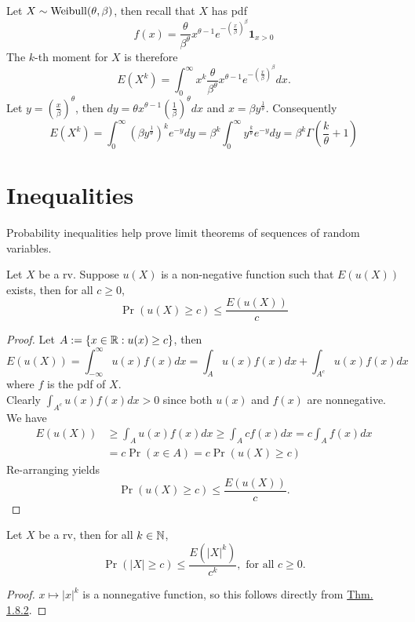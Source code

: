 \documentclass[11pt,fleqn]{book} %
\begin{document}
\begin{example}
Let \(X \sim \operatorname{Weibull}(\theta, \beta)\), then recall that \(X\) has pdf
\[
f(x) = \frac{\theta}{\beta^\theta} x^{\theta - 1}e^{-\left(\frac{x}{\beta}\right)^\beta}\mathbf{1}_{x > 0}
\]
\indent The \(k\)-th moment for \(X\) is therefore
\[
E(X^k) = \int_0^\infty x^k \frac{\theta}{\beta^\theta} x^{\theta - 1} e^{-\left(\frac{x}{\beta}\right)^\beta} dx.
\]
\indent Let \(y = \left(\frac{x}{\beta}\right)^\theta\), then \(dy = \theta x^{\theta - 1}\left(\frac1\beta\right)^\theta dx\) and \(x = \beta y^{\frac1\theta}\). Consequently
\[
E(X^k) = \int_0^\infty \left(\beta y^{\frac1\theta}\right)^k e^{-y}dy = \beta^k\int_0^\infty y^{\frac{k}{\theta}}e^{-y}dy = \beta^k\Gamma\left(\frac{k}{\theta} + 1\right)
\]
\end{example}


\section{Inequalities}

\begin{remark} Probability inequalities help prove limit theorems of sequences of random variables.
\end{remark}

\begin{theorem}
\label{thm:182}
Let \(X\) be a rv. Suppose \(u(X)\) is a non-negative function such that \(E(u(X))\) exists, then for all \(c \geq 0\), 
\[
\Pr(u(X) \geq c) \leq \frac{E(u(X))}{c}
\]
\end{theorem}
\begin{proof} Let \(A := \{x \in \mathbb{R}: u(x) \geq c\}\), then
\[
E(u(X)) = \int_{-\infty}^\infty u(x)f(x)dx = \int_A u(x)f(x)dx + \int_{A^c}u(x)f(x)dx
\]
where \(f\) is the pdf of \(X\).\\
\indent Clearly \(\int_{A^c} u(x)f(x)dx > 0\) since both \(u(x)\) and \(f(x)\) are nonnegative. We have
\[
\begin{aligned}
E(u(X)) &\geq \int_A u(x)f(x)dx \geq \int_A cf(x)dx = c\int_A f(x)dx \\
&= c\Pr(x \in A) = c\Pr(u(X) \geq c)
\end{aligned}
\]
\indent Re-arranging yields
\[
\Pr(u(X) \geq c) \leq \frac{E(u(X))}{c}.
\]
\end{proof}

\begin{corollary} Let \(X\) be a rv, then for all \(k \in \mathbb{N}\), 
\[
\Pr(|X| \geq c) \leq \frac{E(|X|^k)}{c^k}, \text{ for all } c \geq 0.
\]
\end{corollary}
\begin{proof} \(x \mapsto |x|^k\) is a nonnegative function, so this follows directly from \hyperref[thm:182]{Thm. 1.8.2}.
\end{proof}
\end{document}
